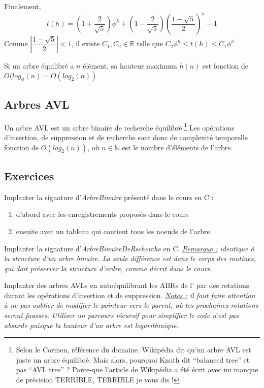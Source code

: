 \documentclass[../../../main.tex]{subfiles}
\begin{document}
Finalement,
$$t(h) = (1 + \frac{2}{\sqrt{5}})\phi^h + (1 - \frac{2}{\sqrt{5}})\left(\dfrac{1 - \sqrt{5}}{2}\right)^h - 1$$
Comme $\left|\dfrac{1 - \sqrt{5}}{2}\right| < 1$, il existe $C_1, C_2\in\mathbb{R}$ telle que $C_2\phi^h \leq t(h)\leq C_1\phi^h$

Si un arbre équilibré a $n$ élément, sa hauteur maximum $h(n)$ est fonction de $O(log_\phi(n) = O(log_2(n))$
\subsection{Arbres AVL}
 {
	Un arbre AVL est un arbre binaire de recherche équilibré.\footnote{Selon le Cormen, référence du domaine. Wikipédia dit qu'un arbre AVL est juste un arbre équilibré. Mais alors, pourquoi Knuth dit ``balanced tree'' et pas ``AVL tree'' ? Parce-que l'article de Wikipédia a été écrit avec un manque de précision TERRIBLE, TERRIBLE je vous dis !}
}
Les opérations d'insertion, de suppression et de recherche sont donc de complexité temporelle fonction de $O(log_2(n))$, où $n\in\mathbb{N}$ est le nombre d'éléments de l'arbre.
\subsection{Exercices}
 Implanter la signature d'\textit{ArbreBinaire} présenté dans le cours en C :
\begin{enumerate}
	\item d'abord avec les enregistrements proposés dans le cours
	\item ensuite avec un tableau qui contient tous les noeuds de l'arbre
\end{enumerate}

 Implanter la signature d'\textit{ArbreBinaireDeRecherche} en C.\newline
\textit{\underline{Remarque :} identique à la structure d'un arbre binaire. La seule différence est dans le corps des routines, qui doit préserver la structure d'ordre, comme décrit dans le cours.}

 \newline
Implanter des arbres AVLs en autoéquilibrant les ABRs de l' par des rotations durant les opérations d'insertion et de suppression. \newline
\textit{\underline{Notes :} il faut faire attention à ne pas oublier de modifier le pointeur vers le parent, où les prochaines rotations seront fausses. Utiliser un parcours récursif pour simplifier le code n'est pas absurde puisque la hauteur d'un arbre est logarithmique.}




\end{document}
